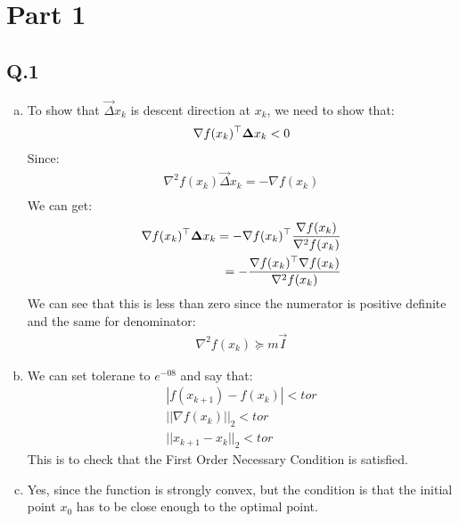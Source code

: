 \documentclass[12pt,twoside]{article}
\begin{document}



\section{Part 1}


\subsection{Q.1}


\begin{enumerate}[a)]
\item
To show that $\vec{\Delta} x_k$ is descent direction at $x_k$, we need to show that:
\begin{align}
\nabla f(x_k)^\top {\boldsymbol{{\Delta}}} x_k < 0 \\
\end{align}
Since:
\begin{align}
\nabla^2 f(x_k) \vec{\Delta} x_k = - \nabla f(x_k)\\
\end{align}
We can get:
\begin{align}
\nabla f(x_k)^\top {\boldsymbol{{\Delta}}} x_k = - \nabla f(x_k)^\top  \frac{\nabla f(x_k)}{\nabla^2 f(x_k)}\\
= - \frac{\nabla f(x_k)^\top \nabla f(x_k)}{\nabla^2 f(x_k)}
\end{align}
We can see that this is less than zero since the numerator is positive definite and the same for denominator:
\begin{align}
\nabla^2 f(x_k) \succeq m\vec{I}
\end{align}



\item
We can set tolerane to $e^{-08}$ and say that:
\begin{align}
|f(x_{k+1}) - f(x_k)| < tor\\
||\nabla f(x_k)||_2 < tor\\
||x_{k+1} - x_k||_2 < tor
\end{align}
This is to check that the First Order Necessary Condition is satisfied.

\item
Yes, since the function is strongly convex, but the condition is that the initial point $x_0$ has to be close enough to the optimal point.


\end{enumerate}
\end{document}
